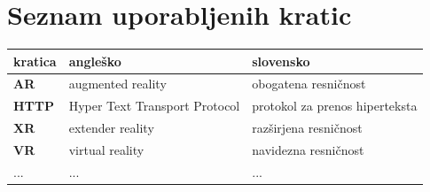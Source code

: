 \chapter*{Seznam uporabljenih kratic}

\begin{tabular}{l|l|l}
  {\bf kratica} & {\bf angleško} & {\bf slovensko} \\ \hline
  {\bf AR} & augmented reality & obogatena resničnost \\
  {\bf HTTP} & Hyper Text Transport Protocol & protokol za prenos hiperteksta \\
  {\bf XR} & extender reality & razširjena resničnost \\
  {\bf VR} & virtual reality & navidezna resničnost \\
  ... & ... & ... \\
\end{tabular}